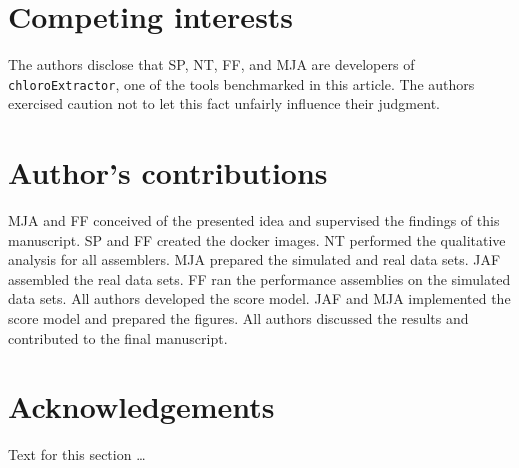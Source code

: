 \documentclass{bmcart}
\newcommand{\formatprogramnames}[1]{\texttt{#1}}
\newcommand{\ce}{\formatprogramnames{chloroExtractor}}
\begin{document}
\begin{backmatter}

\section*{Competing interests}
  The authors disclose that SP, NT, FF, and MJA are developers of \ce{}, one of the tools benchmarked in this article. The authors exercised caution not to let this fact unfairly influence their judgment.

\section*{Author's contributions}
MJA and FF conceived of the presented idea and supervised the findings of this manuscript.
SP and FF created the docker images.
NT performed the qualitative analysis for all assemblers.
MJA prepared the simulated and real data sets.
JAF assembled the real data sets.
FF ran the performance assemblies on the simulated data sets.
All authors developed the score model.
JAF and MJA implemented the score model and prepared the figures.
All authors discussed the results and contributed to the final manuscript.

\section*{Acknowledgements}
  Text for this section \ldots



\end{backmatter}
\end{document}
